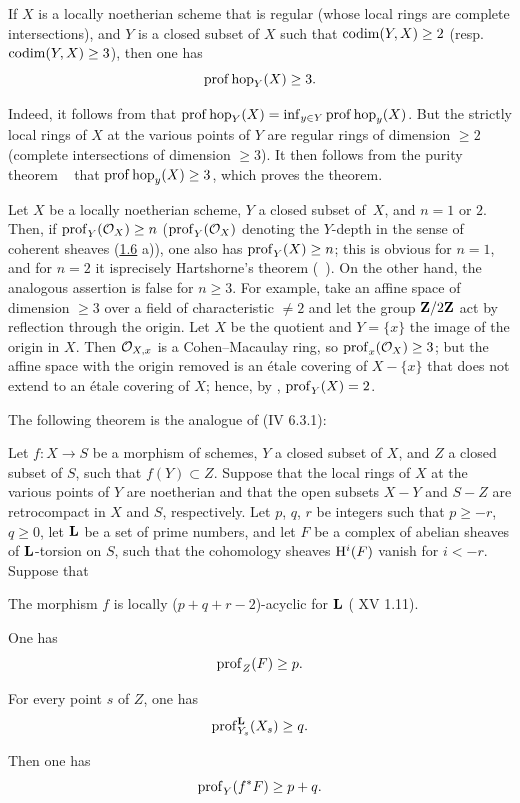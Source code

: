 \begin{theoreme} \label{XIV.1.11}
If $X$ is a locally noetherian scheme that is regular (\resp whose local rings are complete intersections), and $Y$ is a closed subset of $X$ such that $\operatorname{codim}(Y, X)\geq 2$ (resp.\ \hbox{$\operatorname{codim}(Y, X)\geq3$}), then one has
$$
\operatorname{prof} \operatorname{hop}_Y(X)\geq 3.
$$
\end{theoreme}

Indeed, it follows from  that $\operatorname{prof} \operatorname{hop}_Y(X)=\inf_{y\in Y} \operatorname{prof} \operatorname{hop}_y(X)$. But the strictly local rings of $X$ at the various points of $Y$ are regular rings of dimension $\geq 2$ (\resp complete intersections of dimension $\geq 3$). It then follows from the purity theorem ~ that $\operatorname{prof} \operatorname{hop}_y(X)\geq 3$, which proves the theorem.

\begin{exemple} \label{XIV.1.12}
Let $X$ be a locally noetherian scheme, $Y$ a closed subset of~$X$, and $n=1$ or $2$. Then, if $\operatorname{prof}_Y(\mathcal O_X)\geq n$ ($\operatorname{prof}_Y(\mathcal O_X)$ denoting the $Y$-depth in the sense of coherent sheaves (\cf \hyperref[XIV.1.6]{1.6} a)), one also has $\operatorname{prof}_Y(X)\geq n$; this is obvious for $n=1$, and for $n=2$ it is\pageoriginale precisely Hartshorne's theorem (~). On the other hand, the analogous assertion is false for $n\geq 3$. For example, take an affine space of dimension $\geq 3$ over a field of characteristic $\neq 2$ and let the group $\mathbf Z/2\mathbf Z$ act by reflection through the origin. Let $X$ be the quotient and $Y=\{x\}$ the image of the origin in $X$. Then $\mathcal O_{X, x}$ is a Cohen--Macaulay ring, so $\operatorname{prof}_x(\mathcal O_X)\geq 3$; but the affine space with the origin removed is an \'{e}tale covering of $X-\{x\}$ that does not extend to an \'{e}tale covering of $X$; hence, by , $\operatorname{prof}_Y(X)=2$.
\end{exemple}

The following theorem is the analogue of (\EGA IV 6.3.1):

\begin{theoreme} \label{XIV.1.13}
Let $f:X\to S$ be a morphism of schemes, $Y$ a closed subset of $X$, and $Z$ a closed subset of $S$, such that $f(Y)\subset Z$. Suppose that the local rings of $X$ at the various points of $Y$ are noetherian and that the open subsets $X-Y$ and $S-Z$ are retrocompact in $X$ and $S$, respectively. Let $p$, $q$, $r$ be integers such that $p\geq -r$, $q\geq 0$, let $\mathbf L$ be a set of prime numbers, and let $F$ be a complex of abelian sheaves of $\mathbf L$-torsion on $S$, such that the cohomology sheaves $\mathrm H^i(F)$ vanish for $i<-r$. Suppose that
\begin{enumeratea}
\item
The morphism $f$ is locally ($p+q+r-2$)-acyclic for $\mathbf L$ \textup{( XV 1.11)}.
\item
One has
$$
\operatorname{prof}_Z(F)\geq p.
$$
\item
For every point $s$ of $Z$, one has
$$
\operatorname{prof}_{Y_s}^{\mathbf L}(X_s)\geq q.
$$
\end{enumeratea}
\noindent
Then one has\pageoriginale
$$
\operatorname{prof}_Y(f^*F)\geq p+q.
$$
\end{theoreme}

